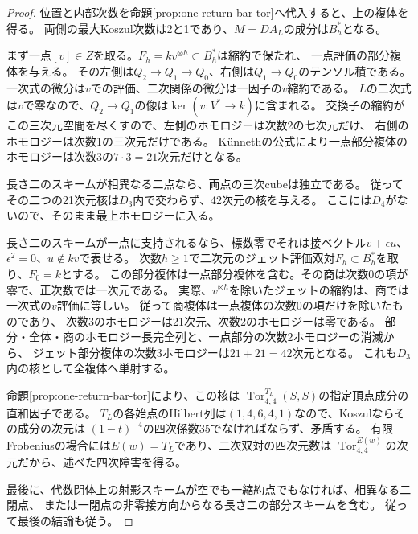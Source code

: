 \begin{proof}
位置と内部次数を命題\ref{prop:one-return-bar-tor}へ代入すると、上の複体を得る。
両側の最大Koszul次数は2と1であり、$M=D A_L$の成分は$B_h^*$となる。

まず一点$[v]\in Z$を取る。$F_h=k v^{\otimes h}\subset B_h^*$は縮約で保たれ、
一点評価の部分複体を与える。
その左側は$Q_2\to Q_1\to Q_0$、右側は$Q_1\to Q_0$のテンソル積である。
一次式の微分は$v$での評価、二次関係の微分は一因子の$v$縮約である。
$L$の二次式は$v$で零なので、$Q_2\to Q_1$の像は$\ker(v:V^*\to k)$に含まれる。
交換子の縮約がこの三次元空間を尽くすので、左側のホモロジーは次数2の七次元だけ、
右側のホモロジーは次数1の三次元だけである。
K\"unnethの公式により一点部分複体のホモロジーは次数3の$7\cdot3=21$次元だけとなる。

長さ二のスキームが相異なる二点なら、両点の三次cubeは独立である。
従ってその二つの21次元核は$D_3$内で交わらず、42次元の核を与える。
ここには$D_4$がないので、そのまま最上ホモロジーに入る。

長さ二のスキームが一点に支持されるなら、標数零でそれは接ベクトル$v+\epsilon u$、
$\epsilon^2=0$、$u\notin kv$で表せる。
次数$h\geq1$で二次元のジェット評価双対$F_h\subset B_h^*$を取り、$F_0=k$とする。
この部分複体は一点部分複体を含む。その商は次数0の項が零で、正次数では一次元である。
実際、$v^{\otimes h}$を除いたジェットの縮約は、商では一次式の$v$評価に等しい。
従って商複体は一点複体の次数0の項だけを除いたものであり、
次数3のホモロジーは21次元、次数2のホモロジーは零である。
部分・全体・商のホモロジー長完全列と、一点部分の次数2ホモロジーの消滅から、
ジェット部分複体の次数3ホモロジーは$21+21=42$次元となる。
これも$D_3$内の核として全複体へ単射する。

命題\ref{prop:one-return-bar-tor}により、この核は
$\operatorname{Tor}^{T_L}_{4,4}(S,S)$の指定頂点成分の直和因子である。
$T_L$の各始点のHilbert列は$(1,4,6,4,1)$なので、Koszulならその成分の次元は
$(1-t)^{-4}$の四次係数35でなければならず、矛盾する。
有限Frobeniusの場合には$E(w)=T_L$であり、二次双対の四次元数は
$\operatorname{Tor}^{E(w)}_{4,4}$の次元だから、述べた四次障害を得る。

最後に、代数閉体上の射影スキームが空でも一縮約点でもなければ、相異なる二閉点、
または一閉点の非零接方向からなる長さ二の部分スキームを含む。
従って最後の結論も従う。
\end{proof}

